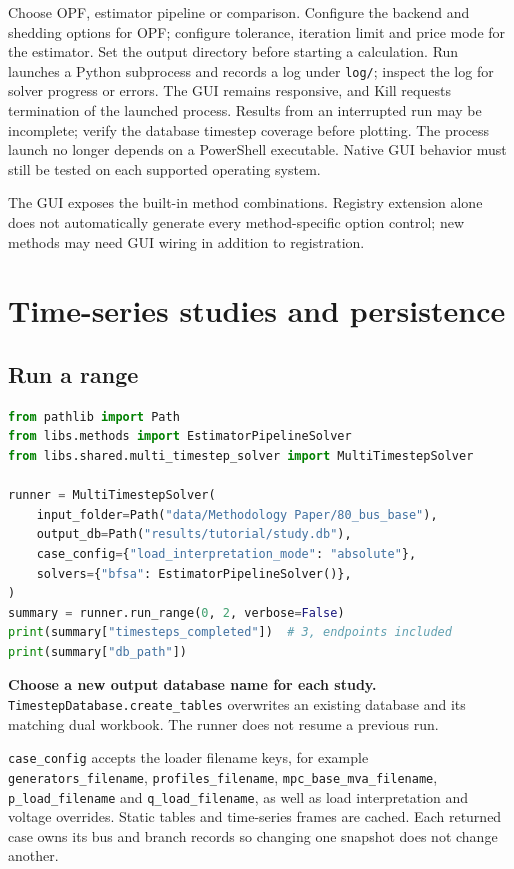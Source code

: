 \documentclass[11pt,a4paper]{article}
\newcommand{\code}[1]{\nolinkurl{#1}}
\begin{document}
Choose OPF, estimator pipeline or comparison. Configure the backend and
shedding options for OPF; configure tolerance, iteration limit and price mode
for the estimator. Set the output directory before starting a calculation.
Run launches a Python subprocess and records a log under \code{log/}; inspect
the log for solver progress or errors. The GUI remains responsive, and Kill
requests termination of the launched process. Results from an interrupted
run may be incomplete; verify the database timestep coverage before plotting.
The process launch no longer depends on a PowerShell executable. Native
GUI behavior must still be tested on each supported operating system.

The GUI exposes the built-in method combinations. Registry extension alone
does not automatically generate every method-specific option control; new
methods may need GUI wiring in addition to registration.

\section{Time-series studies and persistence}
\label{sec:range}
\subsection{Run a range}
\begin{lstlisting}[language=Python]
from pathlib import Path
from libs.methods import EstimatorPipelineSolver
from libs.shared.multi_timestep_solver import MultiTimestepSolver

runner = MultiTimestepSolver(
    input_folder=Path("data/Methodology Paper/80_bus_base"),
    output_db=Path("results/tutorial/study.db"),
    case_config={"load_interpretation_mode": "absolute"},
    solvers={"bfsa": EstimatorPipelineSolver()},
)
summary = runner.run_range(0, 2, verbose=False)
print(summary["timesteps_completed"])  # 3, endpoints included
print(summary["db_path"])
\end{lstlisting}
\textbf{Choose a new output database name for each study.}
\code{TimestepDatabase.create_tables} overwrites an existing database and its
matching dual workbook. The runner does not resume a previous run.

\code{case_config} accepts the loader filename keys, for example
\code{generators_filename}, \code{profiles_filename},
\code{mpc_base_mva_filename}, \code{p_load_filename} and
\code{q_load_filename}, as well as load interpretation and voltage overrides.
Static tables and time-series frames are cached. Each returned case owns its
bus and branch records so changing one snapshot does not change another.
\end{document}
